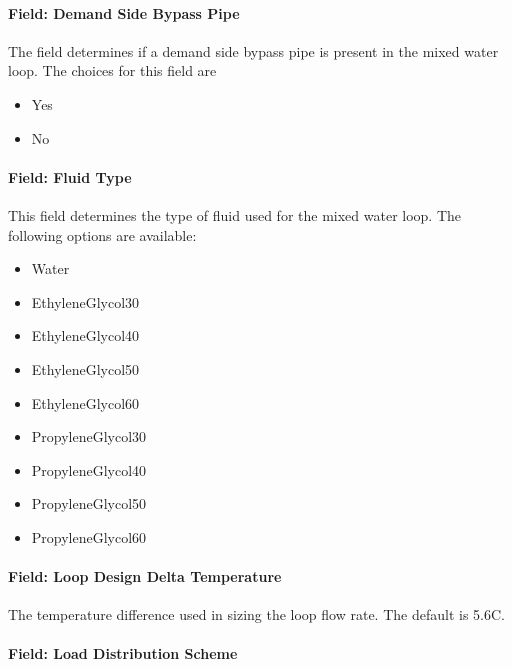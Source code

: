 \paragraph{Field: Demand Side Bypass Pipe}\label{field-demand-side-bypass-pipe-1}

The field determines if a demand side bypass pipe is present in the mixed water loop. The choices for this field are

\begin{itemize}
\item
  Yes
\item
  No
\end{itemize}

\paragraph{Field: Fluid Type}\label{field-fluid-type-2}

This field determines the type of fluid used for the mixed water loop. The following options are available:

\begin{itemize}
\item
  Water
\item
  EthyleneGlycol30
\item
  EthyleneGlycol40
\item
  EthyleneGlycol50
\item
  EthyleneGlycol60
\item
  PropyleneGlycol30
\item
  PropyleneGlycol40
\item
  PropyleneGlycol50
\item
  PropyleneGlycol60
\end{itemize}

\paragraph{Field: Loop Design Delta Temperature}\label{field-loop-design-delta-temperature-2}

The temperature difference used in sizing the loop flow rate. The default is 5.6C.

\paragraph{Field: Load Distribution Scheme}\label{field-load-distribution-scheme-1}

